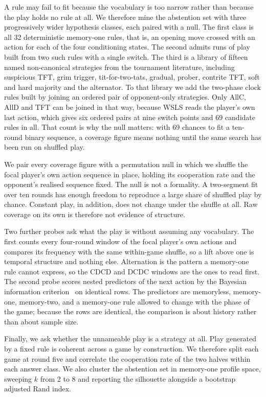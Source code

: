 \documentclass[11pt,a4paper]{article}
\begin{document}
A rule may fail to fit because the vocabulary is too narrow rather than
because the play holds no rule at all. We therefore mine the abstention set
with three progressively wider hypothesis classes, each paired with a null.
The first class is all 32 deterministic memory-one rules, that is, an opening
move crossed with an action for each of the four conditioning states. The
second admits runs of play built from two such rules with a single switch. The
third is a library of fifteen named non-canonical strategies from the
tournament literature, including suspicious TFT, grim trigger,
tit-for-two-tats, gradual, prober, contrite TFT, soft and hard majority and
the alternator. To that library we add the two-phase clock rules built by
joining an ordered pair of opponent-only strategies. Only AllC, AllD and TFT
can be joined in that way, because WSLS reads the player's own last action,
which gives six ordered pairs at nine switch points and 69 candidate rules in
all. That count is why the null matters: with 69 chances to fit a ten-round
binary sequence, a coverage figure means nothing until the same search has
been run on shuffled play.

We pair every coverage figure with a permutation null in which we shuffle the
focal player's own action sequence in place, holding its cooperation rate and
the opponent's realised sequence fixed. The null is not a formality. A
two-segment fit over ten rounds has enough freedom to reproduce a large share
of shuffled play by chance. Constant play, in addition, does not change under
the shuffle at all. Raw coverage on its own is therefore not evidence of
structure.

Two further probes ask what the play is without assuming any vocabulary. The
first counts every four-round window of the focal player's own actions and
compares its frequency with the same within-game shuffle, so a lift above one
is temporal structure and nothing else. Alternation is the pattern a
memory-one rule cannot express, so the CDCD and DCDC windows are the ones to
read first. The second probe scores nested predictors of the next action by
the Bayesian information criterion~\citep{schwarz1978estimating} on identical
rows. The predictors are memoryless, memory-one, memory-two, and a memory-one
rule allowed to change with the phase of the game; because the rows are
identical, the comparison is about history rather than about sample size.

Finally, we ask whether the unnameable play is a strategy at all. Play
generated by a fixed rule is coherent across a game by construction. We
therefore split each game at round five and correlate the cooperation rate of
the two halves within each answer class. We also cluster the abstention set in
memory-one profile space, sweeping $k$ from 2 to 8 and reporting the
silhouette alongside a bootstrap adjusted Rand index.
\end{document}
